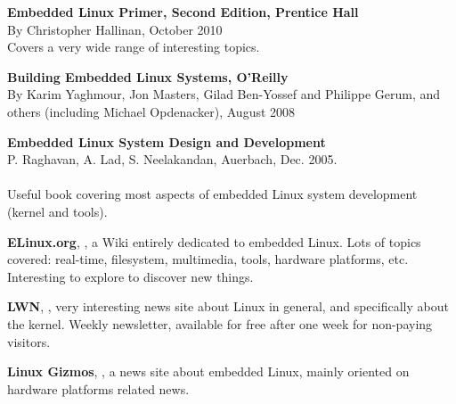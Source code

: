 
    \startitemize
    \item {\bf Embedded Linux Primer, Second Edition, Prentice Hall}\\
      By Christopher Hallinan, October 2010\\
      Covers a very wide range of interesting topics.
    \item {\bf Building Embedded Linux Systems, O'Reilly}\\
      By Karim Yaghmour, Jon Masters, Gilad Ben-Yossef and Philippe
      Gerum, and others
      (including Michael Opdenacker), August 2008\\
    \item {\bf Embedded Linux System Design and Development}\\
      P. Raghavan, A. Lad, S. Neelakandan, Auerbach, Dec. 2005.\\
      \\
      Useful book covering most aspects of embedded Linux system
      development (kernel and tools).
    \stopitemize

  \startitemize
  \item {\bf ELinux.org}, , a Wiki entirely
    dedicated to embedded Linux. Lots of topics covered: real-time,
    filesystem, multimedia, tools, hardware platforms,
    etc. Interesting to explore to discover new things.
  \item {\bf LWN}, , very interesting news site
    about Linux in general, and specifically about the kernel. Weekly
    newsletter, available for free after one week for non-paying
    visitors.
  \item {\bf Linux Gizmos}, , a news site
    about embedded Linux, mainly oriented on hardware platforms
    related news.
  \stopitemize

